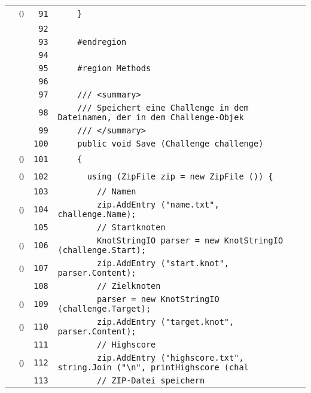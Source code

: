 \documentclass[a4paper,10pt]{article}
\begin{document}
\begin{longtable}[l]{lrrl}
\cellcolor{red} & 0 & \verb~91~ & \verb~    }~\\
\cellcolor{gray} &  & \verb~92~ & \verb~~\\
\cellcolor{gray} &  & \verb~93~ & \verb~    #endregion~\\
\cellcolor{gray} &  & \verb~94~ & \verb~~\\
\cellcolor{gray} &  & \verb~95~ & \verb~    #region Methods~\\
\cellcolor{gray} &  & \verb~96~ & \verb~~\\
\cellcolor{gray} &  & \verb~97~ & \verb~    /// <summary>~\\
\cellcolor{gray} &  & \verb~98~ & \verb~    /// Speichert eine Challenge in dem Dateinamen, der in dem Challenge-Objek~\\
\cellcolor{gray} &  & \verb~99~ & \verb~    /// </summary>~\\
\cellcolor{gray} &  & \verb~100~ & \verb~    public void Save (Challenge challenge)~\\
\cellcolor{red} & 0 & \verb~101~ & \verb~    {~\\
\cellcolor{red} & 0 & \verb~102~ & \verb~      using (ZipFile zip = new ZipFile ()) {~\\
\cellcolor{gray} &  & \verb~103~ & \verb~        // Namen~\\
\cellcolor{red} & 0 & \verb~104~ & \verb~        zip.AddEntry ("name.txt", challenge.Name);~\\
\cellcolor{gray} &  & \verb~105~ & \verb~        // Startknoten~\\
\cellcolor{red} & 0 & \verb~106~ & \verb~        KnotStringIO parser = new KnotStringIO (challenge.Start);~\\
\cellcolor{red} & 0 & \verb~107~ & \verb~        zip.AddEntry ("start.knot", parser.Content);~\\
\cellcolor{gray} &  & \verb~108~ & \verb~        // Zielknoten~\\
\cellcolor{red} & 0 & \verb~109~ & \verb~        parser = new KnotStringIO (challenge.Target);~\\
\cellcolor{red} & 0 & \verb~110~ & \verb~        zip.AddEntry ("target.knot", parser.Content);~\\
\cellcolor{gray} &  & \verb~111~ & \verb~        // Highscore~\\
\cellcolor{red} & 0 & \verb~112~ & \verb~        zip.AddEntry ("highscore.txt", string.Join ("\n", printHighscore (chal~\\
\cellcolor{gray} &  & \verb~113~ & \verb~        // ZIP-Datei speichern~\\

\end{longtable}
\end{document}
